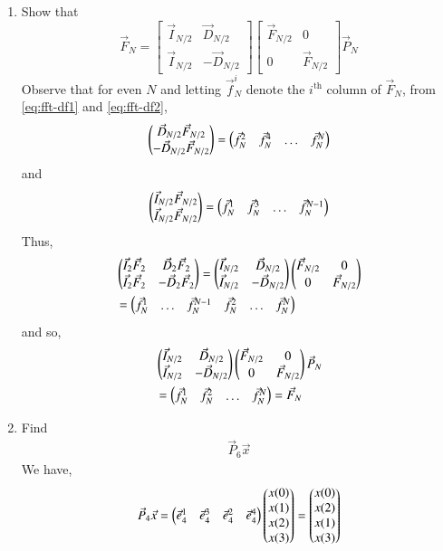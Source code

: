 \documentclass[journal,12pt,twocolumn]{IEEEtran}
\renewcommand\thesection{\arabic{section}}
\begin{document}
\begin{enumerate}[label=\arabic*.,ref=\thesection.\theenumi]
	\item Show that 
	\begin{equation}
		\vec{F}_{N}=
		\begin{bmatrix}
			\vec{I}_{N/2} & \vec{D}_{N/2} \\
			\vec{I}_{N/2} & -\vec{D}_{N/2}
		\end{bmatrix}
		\begin{bmatrix}
			\vec{F}_{N/2} & 0 \\
			0 & \vec{F}_{N/2}
		\end{bmatrix}
		\vec{P}_{N}
	\end{equation}
	\solution Observe that for even $N$ and letting $\vec{f}_N^i$ denote the $i^{\text{th}}$ column of $\vec{F}_N$, from \eqref{eq:fft-df1} and \eqref{eq:fft-df2},
	\begin{align}
		\begin{pmatrix}\vec{D}_{N/2}\vec{F}_{N/2} \\ -\vec{D}_{N/2}\vec{F}_{N/2}\end{pmatrix} = \begin{pmatrix}\vec{f}_N^{2} & \vec{f}_N^{4} & \ldots & \vec{f}_N^{N}\end{pmatrix}
	\end{align}
	and
	\begin{align}
		\begin{pmatrix}\vec{I}_{N/2}\vec{F}_{N/2} \\ \vec{I}_{N/2}\vec{F}_{N/2}\end{pmatrix} = \begin{pmatrix}\vec{f}_N^{1} & \vec{f}_N^{3} & \ldots & \vec{f}_N^{N - 1}\end{pmatrix}
	\end{align}
	Thus,
	\begin{align}
		&\begin{pmatrix}\vec{I}_2\vec{F}_2 & \vec{D}_2\vec{F}_2 \\ \vec{I}_2\vec{F}_2 & -\vec{D}_2\vec{F}_2\end{pmatrix} = \begin{pmatrix}\vec{I}_{N/2} & \vec{D}_{N/2} \\ \vec{I}_{N/2} & -\vec{D}_{N/2}\end{pmatrix}\begin{pmatrix}\vec{F}_{N/2} & 0 \\ 0 & \vec{F}_{N/2}\end{pmatrix} \nonumber \\
		&= \begin{pmatrix}\vec{f}_N^{1} & \ldots & \vec{f}_N^{N - 1} & \vec{f}_N^{2} & \ldots & \vec{f}_N^{N}\end{pmatrix}
	\end{align}
	and so,
	\begin{align}
		&\begin{pmatrix}\vec{I}_{N/2} & \vec{D}_{N/2} \\ \vec{I}_{N/2} & -\vec{D}_{N/2}\end{pmatrix}\begin{pmatrix}\vec{F}_{N/2} & 0 \\ 0 & \vec{F}_{N/2}\end{pmatrix}\vec{P}_{N} \nonumber \\
		&= \begin{pmatrix}\vec{f}_N^{1} & \vec{f}_N^{2} & \ldots & \vec{f}_N^{N}\end{pmatrix} = \vec{F}_N
	\end{align}
	
	\item Find 
	\begin{align}
		\vec{P}_6 \vec{x}
	\end{align}
     \solution We have,
     \begin{align}
     	\vec{P}_4\vec{x} = \begin{pmatrix}\vec{e}_4^1 & \vec{e}_4^3 & \vec{e}_4^2 & \vec{e}_4^4\end{pmatrix}\begin{pmatrix}x(0)\\x(1)\\x(2)\\x(3)\end{pmatrix} = \begin{pmatrix}x(0)\\x(2)\\x(1)\\x(3)\end{pmatrix}
     	\label{eq:x-permute}
     \end{align}
 

\end{enumerate}
\end{document}
